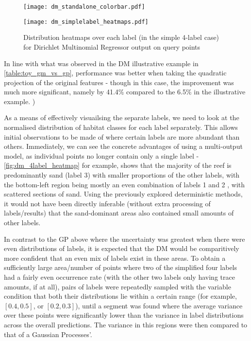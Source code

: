 \begin{figure}[H]
    \begin{minipage}{\linewidth}
        \centerline{\texttt{[image: dm\_standalone\_colorbar.pdf]}}
        \centerline{\texttt{[image: dm\_simplelabel\_heatmaps.pdf]}}
        \caption{Distribution heatmaps over each label (in the simple 4-label case) for Dirichlet Multinomial Regressor output on query points}
        \label{fig:dm_4label_heatmap}
    \end{minipage}
    \hfill
\end{figure}

In line with what was observed in the DM illustrative example in \autoref{table:toy_gm_vs_gp}, performance was better when taking the quadratic projection of the original features - though in this case, the improvement was much more significant, namely by 41.4\% compared to the 6.5\% in the illustrative example. )

As a means of effectively visuailsing the separate labels, we need to look at the normalised distribution of habitat classes for each label separately. This allows initial observations to be made of where certain labels are more abundant than others. Immediately, we can see the concrete advantages of using a multi-output model, as individual points no longer contain only a single label - \autoref{fig:dm_4label_heatmap} for example, shows that the majority of the reef is predominantly sand (label 3) with smaller proportions of the other labels, with the bottom-left region being mostly an even combination of labels 1 and 2 , with scattered sections of sand. Using the previously explored deterministic methods, it would not have been directly inferable (without extra processing of labels/results) that the sand-dominant areas also contained small amounts of other labels.


In contrast to the GP above where the uncertainty was greatest when there were even distributions of labels, it is expected that the DM would be comparitively more confident that an even mix of labels exist in these areas. To obtain a sufficiently large area/number of points where two of the simplified four labels had a fairly even occurrence rate (with the other two labels only having trace amounts, if at all), pairs of labels were repeatedly sampled with the variable condition that both their distributions lie within a certain range (for example, $[0.4, 0.5]$, or $[0.2, 0.3]$), until a segment was found where the average variance over these points were significantly lower than the variance in label distributions across the overall predictions. The variance in this regions were then compared to that of a Gaussian Processes'.

